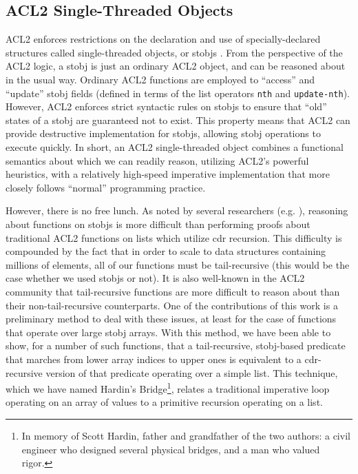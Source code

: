 \documentclass[copyright]{eptcs}
\begin{document}
\subsection{ACL2 Single-Threaded Objects}\label{stobj}

ACL2 enforces restrictions on the declaration and use of
specially-declared structures called 
single-threaded objects, or stobjs \cite{STOBJ}.  From the perspective
of the ACL2 logic, a stobj is just an ordinary ACL2 object, and can be
reasoned about in the usual way.  Ordinary ACL2 functions are employed to
``access'' and ``update'' stobj fields (defined in terms of the list
operators \texttt{nth} and \texttt{update-nth}).  However, ACL2 enforces strict 
syntactic rules on stobjs to ensure that ``old'' states of a stobj are
guaranteed not to exist.  
This property means that ACL2 can provide destructive implementation for stobjs, 
allowing stobj operations to execute quickly.  In short, an ACL2 single-threaded 
object combines a functional semantics about which we can readily
reason, utilizing ACL2's powerful heuristics,  with a relatively
high-speed imperative implementation that more closely follows 
``normal'' programming practice.

However, there is no free lunch.   As noted by several researchers 
(e.g. \cite{Hardin2009a}), reasoning about functions on stobjs is more difficult
than performing proofs about traditional ACL2 functions on lists which 
utilize cdr recursion.  This difficulty is compounded by the fact
that in order to scale to data structures containing millions of
elements, all of our functions must be tail-recursive (this would be
the case whether we used stobjs or not).  It is also well-known in the
ACL2 community that tail-recursive functions are more difficult to
reason about than their non-tail-recursive counterparts.  One of the
contributions of this work is a preliminary method to deal with these
issues, at least for the case of functions that operate over large
stobj arrays.  With this method, we have been able to show, for a number of such 
functions, that a tail-recursive, stobj-based predicate that marches 
from lower array indices to upper ones is equivalent to a 
cdr-recursive version of that predicate operating over a simple list.
This technique, which we have named Hardin's Bridge\footnote{In memory
  of Scott Hardin, father and grandfather of the two authors: a civil engineer who designed
  several physical bridges, and a man who valued rigor.}, relates a
traditional imperative loop operating
on an array of values to a primitive recursion operating on a
list.
\end{document}

